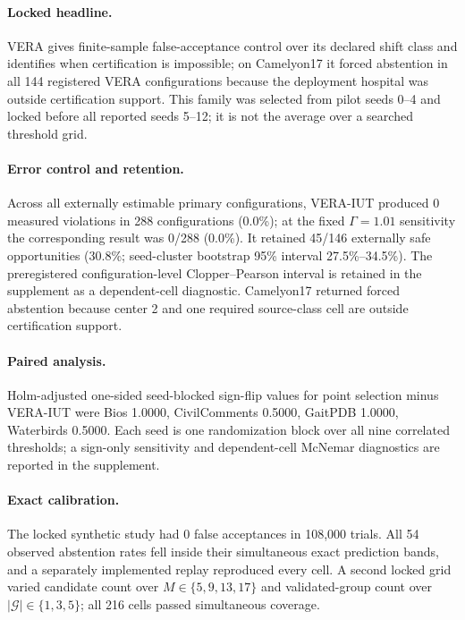 \paragraph{Locked headline.} VERA gives finite-sample false-acceptance control over its declared shift class and identifies when certification is impossible; on Camelyon17 it forced abstention in all 144 registered VERA configurations because the deployment hospital was outside certification support. This family was selected from pilot seeds 0--4 and locked before all reported seeds 5--12; it is not the average over a searched threshold grid.

\paragraph{Error control and retention.} Across all externally estimable primary configurations, VERA-IUT produced 0 measured violations in 288 configurations (0.0\%); at the fixed $\Gamma=1.01$ sensitivity the corresponding result was 0/288 (0.0\%). It retained 45/146 externally safe opportunities (30.8\%; seed-cluster bootstrap 95\% interval 27.5\%--34.5\%). The preregistered configuration-level Clopper--Pearson interval is retained in the supplement as a dependent-cell diagnostic. Camelyon17 returned forced abstention because center 2 and one required source-class cell are outside certification support.

\paragraph{Paired analysis.} Holm-adjusted one-sided seed-blocked sign-flip values for point selection minus VERA-IUT were Bios 1.0000, CivilComments 0.5000, GaitPDB 1.0000, Waterbirds 0.5000. Each seed is one randomization block over all nine correlated thresholds; a sign-only sensitivity and dependent-cell McNemar diagnostics are reported in the supplement.

\paragraph{Exact calibration.} The locked synthetic study had 0 false acceptances in 108,000 trials. All 54 observed abstention rates fell inside their simultaneous exact prediction bands, and a separately implemented replay reproduced every cell. A second locked grid varied candidate count over $M\in\{5,9,13,17\}$ and validated-group count over $|\mathcal G|\in\{1,3,5\}$; all 216 cells passed simultaneous coverage.
